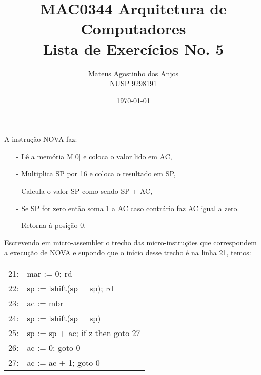 \documentclass[12pt]{article}
\title{MAC0344 Arquitetura de Computadores\\
Lista de Exercícios No. 5
}
\author{Mateus Agostinho dos Anjos\\NUSP 9298191}
\date{\today}
\begin{document}
	\maketitle
    A instrução NOVA faz:
    \begin{itemize}
        \item[-]
            Lê a memória M[0] e coloca o valor lido em AC,
        \item[-]
            Multiplica SP por 16 e coloca o resultado em SP,
        \item[-]  
            Calcula o valor SP como sendo SP + AC,
        \item[-] 
            Se SP for zero então soma 1 a AC
            caso contrário faz AC igual a zero.
        \item[-]
            Retorna à posição 0.
    \end{itemize}

    Escrevendo em micro-assembler o trecho das micro-instruções que 
    correspondem a execução de NOVA e supondo que o início desse trecho é na 
    linha 21, temos:

    \begin{center}
        \begin{tabular}{ll}
            21: &   mar := 0; rd                                \\
            22: &   sp := lshift(sp + sp); rd                   \\
            23: &   ac := mbr                                   \\
            24: &   sp := lshift(sp + sp)                       \\
            25: &   sp := sp + ac; if z then goto 27            \\
            26: &   ac := 0; goto 0                             \\
            27: &   ac := ac + 1; goto 0                        \\
        \end{tabular}
    \end{center}
    
\end{document}

